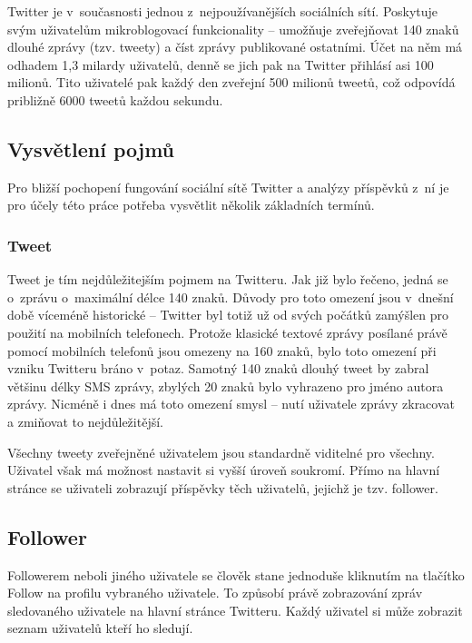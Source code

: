 \documentclass[thesis=B,czech]{FITthesis}[2012/06/26]
\begin{document}
	Twitter je v~současnosti jednou z~nejpoužívanějších sociálních sítí. Poskytuje svým uživatelům mikroblogovací funkcionality -- umožňuje zveřejňovat 140 znaků dlouhé zprávy (tzv. tweety) a číst zprávy publikované ostatními. Účet na něm má odhadem 1,3 milardy uživatelů, denně se jich pak na Twitter přihlásí asi 100 milionů\cite{twitter-stats}. Tito uživatelé pak každý den zveřejní 500 milionů tweetů, což odpovídá približně 6000 tweetů každou sekundu\cite{twitter-stats-2}. 

\subsection{Vysvětlení pojmů}
Pro bližší pochopení fungování sociální sítě Twitter a analýzy příspěvků z~ní je pro účely této práce potřeba vysvětlit několik základních termínů. 

\subsubsection{Tweet}

Tweet je tím nejdůležitejším pojmem na Twitteru. Jak již bylo řečeno, jedná se o~zprávu o~maximální délce 140 znaků. Důvody pro toto omezení jsou v~dnešní době víceméně historické -- Twitter byl totiž už od svých počátků zamýšlen pro použití na mobilních telefonech. Protože klasické textové zprávy posílané právě pomocí mobilních telefonů jsou omezeny na 160 znaků, bylo toto omezení při vzniku Twitteru bráno v~potaz. Samotný 140 znaků dlouhý tweet by zabral většinu délky SMS zprávy, zbylých 20 znaků bylo vyhrazeno pro jméno autora zprávy\cite{twitter-140}. Nicméně i dnes má toto omezení smysl -- nutí uživatele zprávy zkracovat a zmiňovat to nejdůležitější. 

Všechny tweety zveřejněné uživatelem jsou standardně viditelné pro všechny. Uživatel však má možnost nastavit si vyšší úroveň soukromí. Přímo na hlavní stránce se uživateli zobrazují příspěvky těch uživatelů, jejichž je tzv. follower. 

\subsection{Follower}

	Followerem neboli  jiného uživatele se člověk stane jednoduše kliknutím na tlačítko Follow na profilu vybraného uživatele. To způsobí právě zobrazování zpráv sledovaného uživatele na hlavní stránce Twitteru. Každý uživatel si může zobrazit seznam uživatelů kteří ho sledují. 
\end{document}
